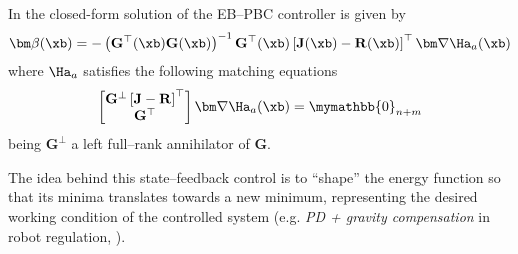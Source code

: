 %
In  \citep{ortega2008control} the closed-form solution of the EB--PBC controller is given by 
%
\begin{equation}\label{eq:ebpbc}
    \bm\beta(\xb) = -\left(\mathbf{G}^{\top}(\xb)\mathbf{G}(\xb)\right)^{-1}\mathbf{G}^{\top}(\xb)\left[\mathbf{J}(\xb)-\mathbf{R}(\xb)\right]^\top\bm\nabla\Ha_a(\xb)
\end{equation}
%
where $\Ha_a$ satisfies the following matching equations 
%
\begin{equation}
    \begin{bmatrix}\mathbf{G}^{\perp}\left[\mathbf{J}-\mathbf{R}\right]^\top\\\mathbf{G}^\top\end{bmatrix}\bm\nabla\Ha_a(\xb) = \mymathbb{0}_{n+m}
\end{equation}
%
being $\mathbf{G}^{\perp}$ a left full--rank annihilator of $\mathbf{G}$.

The idea behind this state--feedback control is to ``shape'' the energy function so that its minima translates towards a new minimum, representing the desired working condition of the controlled system (e.g. \textit{PD + gravity compensation} in robot regulation, \cite{arimoto1984stability, secchi2007control}).


